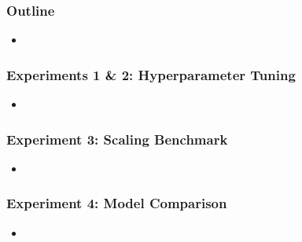 \begin{frame}
	\frametitle{Outline}
	\begin{itemize}
		\item %
	\end{itemize}
\end{frame}

\begin{frame}
	\frametitle{Experiments 1 \& 2: Hyperparameter Tuning}
	\begin{itemize}
		\item %
	\end{itemize}
\end{frame}

\begin{frame}
	\frametitle{Experiment 3: Scaling Benchmark}
	\begin{itemize}
		\item %
	\end{itemize}
\end{frame}

\begin{frame}
	\frametitle{Experiment 4: Model Comparison}
	\begin{itemize}
		\item %
	\end{itemize}
\end{frame}

